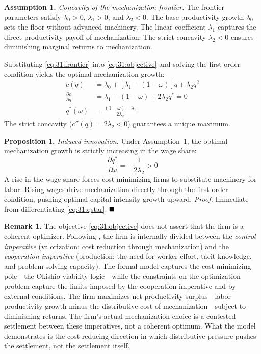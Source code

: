 \textbf{Assumption 1.} \textit{Concavity of the
	mechanization frontier.} The frontier parameters satisfy
$\lambda_0 > 0$, $\lambda_1 > 0$, and $\lambda_2 < 0$. The
base productivity growth $\lambda_0$ sets the floor without
advanced machinery. The linear coefficient $\lambda_1$
captures the direct productivity payoff of mechanization. The
strict concavity $\lambda_2 < 0$ ensures diminishing marginal
returns to mechanization.

Substituting \eqref{eq:31:frontier} into
\eqref{eq:31:objective} and solving the first-order condition
yields the optimal mechanization growth:
\begin{align}
	c(q) &= \lambda_0 + \left[\lambda_1 - (1-\omega)\right] q
	+ \lambda_2 q^2 \label{eq:31:unconstrained} \\
	\frac{\partial c}{\partial q} &= \lambda_1 - (1-\omega) + 2\lambda_2 q^*
	= 0 \label{eq:31:foc} \\
	q^*(\omega) &= \frac{(1-\omega) - \lambda_1}{2\lambda_2}
	\label{eq:31:qstar}
\end{align}
The strict concavity ($c''(q) = 2\lambda_2 < 0$) guarantees
a unique maximum.

\textbf{Proposition 1.} \textit{Induced innovation.} Under
Assumption~1, the optimal mechanization growth is strictly
increasing in the wage share:
\begin{equation}
	\frac{\partial q^*}{\partial \omega}
	= -\frac{1}{2\lambda_2} > 0
	\label{eq:31:comparative_static}
\end{equation}
A rise in the wage share forces cost-minimizing firms to
substitute machinery for labor. Rising wages drive
mechanization directly through the first-order condition,
pushing optimal capital intensity growth upward.
\textit{Proof.} Immediate from differentiating
\eqref{eq:31:qstar}. $\hfill\blacksquare$

\textbf{Remark 1.} The objective
\eqref{eq:31:objective} does not assert that the firm is a
coherent optimizer. Following \citet{Vidal2022}, the firm is
internally divided between the \textit{control imperative}
(valorization: cost reduction through mechanization) and the
\textit{cooperation imperative} (production: the need for
worker effort, tacit knowledge, and problem-solving
capacity). The formal model captures the cost-minimizing
pole---the Okishio viability logic---while the constraints on
the optimization problem capture the limits imposed by the
cooperation imperative and by external conditions. The firm
maximizes net productivity surplus---labor productivity
growth minus the distributive cost of mechanization---subject
to diminishing returns. The firm's actual mechanization
choice is a contested settlement between these imperatives,
not a coherent optimum. What the model demonstrates is the
cost-reducing direction in which distributive pressure pushes
the settlement, not the settlement itself.


